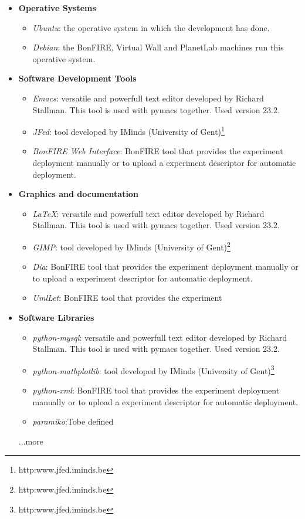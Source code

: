\begin{itemize}
\item \textbf{Operative Systems}
\begin{itemize}
\item{\emph{Ubuntu}}: the operative system in which the development has done.
\item{\emph{Debian}}: the BonFIRE, Virtual Wall and PlanetLab machines run this operative system.
\end{itemize}
\item \textbf{Software Development Tools}

\begin{itemize}
\item{\emph{Emacs}}: versatile and powerfull text editor developed by Richard
  Stallman. This tool is used with pymacs together. Used version 23.2.
\item{\emph{JFed}}: tool developed by IMinds (University of Gent)\footnote{http:www.jfed.iminds.be}
\item{\emph{BonFIRE Web Interface}}: BonFIRE tool that provides the experiment
  deployment manually or to upload a experiment descriptor for automatic deployment.
\end{itemize}


\item \textbf{Graphics and documentation}

\begin{itemize}
\item{\emph{\LaTeX}}: versatile and powerfull text editor developed by Richard
  Stallman. This tool is used with pymacs together. Used version 23.2.
\item{\emph{GIMP}}: tool developed by IMinds (University of Gent)\footnote{http:www.jfed.iminds.be}
\item{\emph{Dia}}: BonFIRE tool that provides the experiment
  deployment manually or to upload a experiment descriptor for automatic deployment.
\item{\emph{UmlLet}}: BonFIRE tool that provides the experiment

\end{itemize}

\item \textbf{Software Libraries}

\begin{itemize}
\item{\emph{python-mysql}}: versatile and powerfull text editor developed by Richard
  Stallman. This tool is used with pymacs together. Used version 23.2.
\item{\emph{python-mathplotlib}}: tool developed by IMinds (University of Gent)\footnote{http:www.jfed.iminds.be}
\item{\emph{python-xml}}: BonFIRE tool that provides the experiment
  deployment manually or to upload a experiment descriptor for automatic deployment.
\item{\emph{paramiko}}:Tobe defined

\end{itemize}
...more
\end{itemize}
